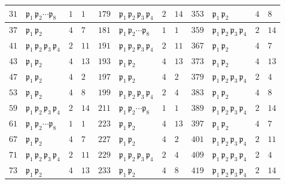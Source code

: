 \begin{figure}
\begin{center}
\begin{tabular}{x{0.75cm}x{1.75cm}x{0.75cm}x{0.9cm}x{0.75cm}x{1.75cm}x{0.75cm}x{0.9cm}x{0.75cm}x{1.75cm}x{0.75cm}x{0.9cm}}
      \hline
      $31$ & $\mathfrak{p}_1\,\mathfrak{p}_2\cdots\mathfrak{p}_8$ & $1$ & $1$ & $179$ & $\mathfrak{p}_1\,\mathfrak{p}_2\,\mathfrak{p}_3\,\mathfrak{p}_4$ & $2$ & $14$ & $353$ & $\mathfrak{p}_1\,\mathfrak{p}_2$ & $4$ & $8$ \tabularnewline
      \hline
      $37$ & $\mathfrak{p}_1\,\mathfrak{p}_2$ & $4$ & $7$ & $181$ & $\mathfrak{p}_1\,\mathfrak{p}_2\cdots\mathfrak{p}_8$ & $1$ & $1$ & $359$ & $\mathfrak{p}_1\,\mathfrak{p}_2\,\mathfrak{p}_3\,\mathfrak{p}_4$ & $2$ & $14$ \tabularnewline
      \hline
      $41$ & $\mathfrak{p}_1\,\mathfrak{p}_2\,\mathfrak{p}_3\,\mathfrak{p}_4$ & $2$ & $11$ & $191$ & $\mathfrak{p}_1\,\mathfrak{p}_2\,\mathfrak{p}_3\,\mathfrak{p}_4$ & $2$ & $11$ & $367$ & $\mathfrak{p}_1\,\mathfrak{p}_2$ & $4$ & $7$ \tabularnewline
      \hline
      $43$ & $\mathfrak{p}_1\,\mathfrak{p}_2$ & $4$ & $13$ & $193$ & $\mathfrak{p}_1\,\mathfrak{p}_2$ & $4$ & $13$ & $373$ & $\mathfrak{p}_1\,\mathfrak{p}_2$ & $4$ & $13$ \tabularnewline
      \hline
      $47$ & $\mathfrak{p}_1\,\mathfrak{p}_2$ & $4$ & $2$ & $197$ & $\mathfrak{p}_1\,\mathfrak{p}_2$ & $4$ & $2$ & $379$ & $\mathfrak{p}_1\,\mathfrak{p}_2\,\mathfrak{p}_3\,\mathfrak{p}_4$ & $2$ & $4$ \tabularnewline
      \hline
      $53$ & $\mathfrak{p}_1\,\mathfrak{p}_2$ & $4$ & $8$ & $199$ & $\mathfrak{p}_1\,\mathfrak{p}_2\,\mathfrak{p}_3\,\mathfrak{p}_4$ & $2$ & $4$ & $383$ & $\mathfrak{p}_1\,\mathfrak{p}_2$ & $4$ & $8$ \tabularnewline
      \hline
      $59$ & $\mathfrak{p}_1\,\mathfrak{p}_2\,\mathfrak{p}_3\,\mathfrak{p}_4$ & $2$ & $14$ & $211$ & $\mathfrak{p}_1\,\mathfrak{p}_2\cdots\mathfrak{p}_8$ & $1$ & $1$ & $389$ & $\mathfrak{p}_1\,\mathfrak{p}_2\,\mathfrak{p}_3\,\mathfrak{p}_4$ & $2$ & $14$ \tabularnewline
      \hline
      $61$ & $\mathfrak{p}_1\,\mathfrak{p}_2\cdots\mathfrak{p}_8$ & $1$ & $1$ & $223$ & $\mathfrak{p}_1\,\mathfrak{p}_2$ & $4$ & $13$ & $397$ & $\mathfrak{p}_1\,\mathfrak{p}_2$ & $4$ & $7$ \tabularnewline
      \hline
      $67$ & $\mathfrak{p}_1\,\mathfrak{p}_2$ & $4$ & $7$ & $227$ & $\mathfrak{p}_1\,\mathfrak{p}_2$ & $4$ & $2$ & $401$ & $\mathfrak{p}_1\,\mathfrak{p}_2\,\mathfrak{p}_3\,\mathfrak{p}_4$ & $2$ & $11$ \tabularnewline
      \hline
      $71$ & $\mathfrak{p}_1\,\mathfrak{p}_2\,\mathfrak{p}_3\,\mathfrak{p}_4$ & $2$ & $11$ & $229$ & $\mathfrak{p}_1\,\mathfrak{p}_2\,\mathfrak{p}_3\,\mathfrak{p}_4$ & $2$ & $4$ & $409$ & $\mathfrak{p}_1\,\mathfrak{p}_2\,\mathfrak{p}_3\,\mathfrak{p}_4$ & $2$ & $4$ \tabularnewline
      \hline
      $73$ & $\mathfrak{p}_1\,\mathfrak{p}_2$ & $4$ & $13$ & $233$ & $\mathfrak{p}_1\,\mathfrak{p}_2$ & $4$ & $8$ & $419$ & $\mathfrak{p}_1\,\mathfrak{p}_2\,\mathfrak{p}_3\,\mathfrak{p}_4$ & $2$ & $14$ \tabularnewline

\end{tabular}
\end{center}
\end{figure}
